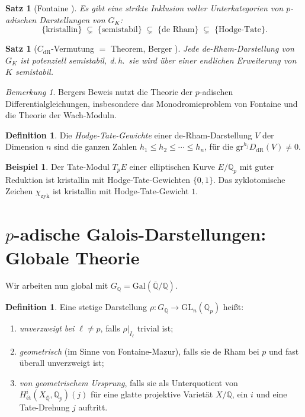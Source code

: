 \documentclass[12pt,a4paper]{amsart}
\newtheorem{satz}[theorem]{Satz}
\theoremstyle{definition}
\newtheorem{definition_de}[theorem]{Definition}
\newtheorem{example}[theorem]{Beispiel}
\theoremstyle{remark}
\newtheorem{bemerkung}[theorem]{Bemerkung}
\newcommand{\Gal}{\mathrm{Gal}}
\newcommand{\GL}{\mathrm{GL}}
\newcommand{\Qp}{\mathbb{Q}_p}
\newcommand{\Qbar}{\overline{\mathbb{Q}}}
\newcommand{\GQ}{G_{\mathbb{Q}}}
\newcommand{\DdR}{D_{\mathrm{dR}}}
\newcommand{\Q}{\mathbb{Q}}
\begin{document}
\begin{satz}[Fontaine {\cite[Theorem A]{Fontaine1994}}]
  Es gibt eine strikte Inklusion voller Unterkategorien von $p$-adischen Darstellungen
  von $G_K$:
  \[
    \{ \text{kristallin} \} \;\subsetneq\; \{ \text{semistabil} \} \;\subsetneq\;
    \{ \text{de Rham} \} \;\subsetneq\; \{ \text{Hodge-Tate} \}.
  \]
\end{satz}

\begin{satz}[$C_{\mathrm{dR}}$-Vermutung $=$ Theorem, Berger \cite{Berger2002}]
  Jede de-Rham-Darstellung von $G_K$ ist potenziell semistabil, d.\,h.\ sie wird über
  einer endlichen Erweiterung von $K$ semistabil.
\end{satz}

\begin{bemerkung}
  Bergers Beweis \cite{Berger2002} nutzt die Theorie der $p$-adischen
  Differentialgleichungen, insbesondere das Monodromieproblem von Fontaine und die
  Theorie der Wach-Moduln.
\end{bemerkung}

\begin{definition_de}
  Die \emph{Hodge-Tate-Gewichte} einer de-Rham-Darstellung $V$ der Dimension $n$ sind
  die ganzen Zahlen $h_1 \leq h_2 \leq \cdots \leq h_n$, für die
  $\mathrm{gr}^{h_j} \DdR(V) \neq 0$.
\end{definition_de}

\begin{example}
  Der Tate-Modul $T_p E$ einer elliptischen Kurve $E/\Q_p$ mit guter Reduktion ist
  kristallin mit Hodge-Tate-Gewichten $\{0, 1\}$.
  Das zyklotomische Zeichen $\chi_{\mathrm{zyk}}$ ist kristallin mit
  Hodge-Tate-Gewicht $1$.
\end{example}

\section{$p$-adische Galois-Darstellungen: Globale Theorie}\label{sec:galoisdarstellungen}

Wir arbeiten nun global mit $\GQ = \Gal(\Qbar/\Q)$.

\begin{definition_de}
  Eine stetige Darstellung $\rho\colon \GQ \to \GL_n(\Qp)$ heißt:
  \begin{enumerate}[label=(\roman*)]
    \item \emph{unverzweigt bei $\ell \neq p$}, falls $\rho|_{I_\ell}$ trivial ist;
    \item \emph{geometrisch} (im Sinne von Fontaine-Mazur), falls sie de Rham bei $p$
      und fast überall unverzweigt ist;
    \item \emph{von geometrischem Ursprung}, falls sie als Unterquotient von
      $H^i_{\text{\'et}}(X_{\Qbar}, \Qp)(j)$ für eine glatte projektive Varietät $X/\Q$,
      ein $i$ und eine Tate-Drehung $j$ auftritt.
  \end{enumerate}
\end{definition_de}
\end{document}
